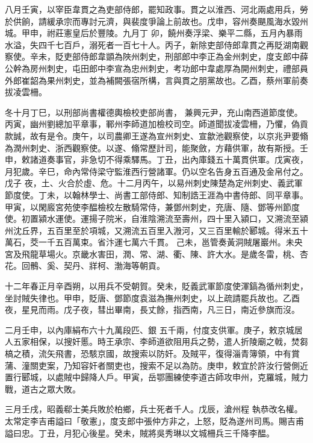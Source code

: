 \begin{pinyinscope}
 八月壬寅，以宰臣韋貫之為吏部侍郎，罷知政事。貫之以淮西、河北兩處用兵，勞於供餉，請緩承宗而專討元濟，與裴度爭論上前故也。戊申，容州奏颶風海水毀州城。甲申，祔莊憲皇后於豐陵。九月丁
 卯，饒州奏浮梁、樂平二縣，五月內暴雨水溢，失四千七百戶，溺死者一百七十人。丙子，新除吏部侍郎韋貫之再貶湖南觀察使。辛未，貶吏部侍郎韋顗為陜州刺史，刑部郎中李正為金州刺史，度支郎中薛公幹為房州刺史，屯田郎中李宣為忠州刺史，考功郎中韋處厚為開州刺史，禮部員外郎崔韶為果州刺史，並為補闕張宿所構，言與貫之朋黨故也。乙酉，蔡州軍前奏拔凌雲柵。



 冬十月丁巳，以刑部尚書權德輿檢校吏部尚書，
 兼興元尹，充山南西道節度使。丙寅，幽州劉總加平章事，鄆州李師道加檢校司空。師道聞拔凌雲柵，乃懼，偽貢款誠，故有是令。庚午，以司農卿王遂為宣州刺史、宣歙池觀察使，以京兆尹要翛為潤州刺史、浙西觀察使。以遂、翛常歷計司，能聚斂，方藉供軍，故有斯授。壬申，敕諸道奏事官，非急切不得乘驛馬。丁丑，出內庫錢五十萬貫供軍。戊寅夜，月犯歲。辛巳，命內常侍梁守監淮西行營諸軍。仍以空名告身五百通及金帛付之。戊子
 夜，土、火合於虛、危。十二月丙午，以易州刺史陳楚為定州刺史、義武軍節度使。丁未，以翰林學士、尚書工部侍郎、知制誥王涯為中書侍郎、同平章事。甲寅，以閑廄宮苑使李醖檢校左散騎常侍，兼鄧州刺史，充唐、隨、鄧等州節度使。初置潁水運使。運揚子院米，自淮陰溯流至壽州，四十里入潁口，又溯流至潁州沈丘界，五百里至於項城，又溯流五百里入溵河，又三百里輸於郾城。得米五十萬石，茭一千五百萬束。省汴運七萬六千貫。
 己未，邕管奏黃洞賊屠巖州。未央宮及飛龍草場火。京畿水害田，潤、常、湖、衢、陳、許大水。是歲冬雷，桃、杏花。回鶻、奚、契丹、牂柯、渤海等朝貢。



 十二年春正月辛酉朔，以用兵不受朝賀。癸未，貶義武軍節度使渾鎬為循州刺史，坐討賊失律也。甲申，貶唐、鄧節度袁滋為撫州刺史，以上疏請罷兵故也。乙酉夜，星見而雨。戊子夜，彗出畢南，長丈餘，指西南，凡三日，南近參旗而沒。



 二月壬申，以內庫絹布六十九萬段匹、銀
 五千兩，付度支供軍。庚子，敕京城居人五家相保，以搜奸慝。時王承宗、李師道欲阻用兵之勢，遣人折陵廟之戟，焚芻槁之積，流矢飛書，恐駭京國，故搜索以防奸。及賊平，復得淄青簿領，中有賞蒲、潼關吏案，乃知容奸者關吏也，搜索不足以為防。庚申，敕宜於許汝行營側近置行郾城，以處賊中歸降人戶。甲寅，岳鄂團練使李道古師攻申州，克羅城，賊力戰，道古之眾大敗。



 三月壬戌，昭義郗士美兵敗於柏鄉，兵士死者千人。戊辰，滄州程
 執恭改名權。太常定李吉甫謚曰「敬憲」，度支郎中張仲方非之，上怒，貶為遂州司馬。賜吉甫謚曰忠。丁丑，月犯心後星。癸未，賊將吳秀琳以文城柵兵三千降李醖。




\end{pinyinscope}
